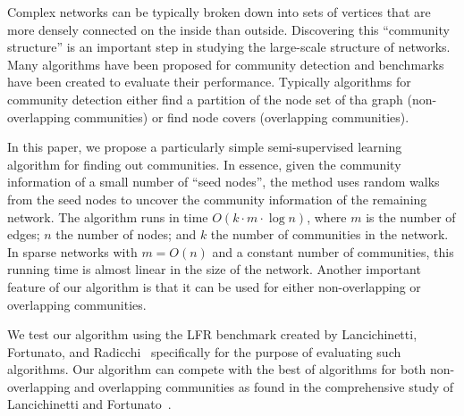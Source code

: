 Complex networks can be typically broken down into sets of vertices that are
more densely connected on the inside than outside. Discovering this ``community
structure'' is an important step in studying the large-scale structure of
networks. Many algorithms have been proposed for community detection and
benchmarks have been created to evaluate their performance. Typically algorithms
for community detection either find a partition of the node set of tha graph 
(non-overlapping communities) or find node covers (overlapping communities). 

In this paper, we propose a particularly simple semi-supervised learning
algorithm for finding out communities. In essence, given the community
information of a small number of ``seed nodes'', the method uses random walks
from the seed nodes to uncover the community information of the remaining network.
The algorithm runs in time $O(k \cdot m \cdot \log n)$, where $m$ is the number
of edges; $n$ the number of nodes; and $k$ the number of communities in the
network.  In sparse networks with $m = O(n)$ and a constant number of
communities, this running time is almost linear in the size of the network.
Another important feature of our algorithm is that it can be used for either
non-overlapping or overlapping communities. 

We test our algorithm using the LFR benchmark created by Lancichinetti,
Fortunato, and Radicchi~\cite{LFR08} specifically for the purpose of evaluating
such algorithms. Our algorithm can compete with the best of algorithms for both
non-overlapping and overlapping communities as found in the comprehensive study
of Lancichinetti and Fortunato~\cite{LF09}.
